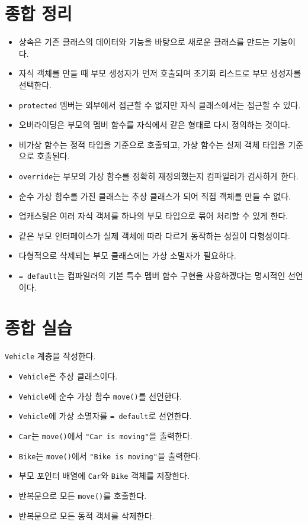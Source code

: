 \documentclass[11pt,a4paper]{article}
\begin{document}
\section{종합 정리}
\begin{importantbox}
\begin{itemize}[leftmargin=1.5em]
    \item 상속은 기존 클래스의 데이터와 기능을 바탕으로 새로운 클래스를 만드는 기능이다.
    \item 자식 객체를 만들 때 부모 생성자가 먼저 호출되며 초기화 리스트로 부모 생성자를 선택한다.
    \item \texttt{protected} 멤버는 외부에서 접근할 수 없지만 자식 클래스에서는 접근할 수 있다.
    \item 오버라이딩은 부모의 멤버 함수를 자식에서 같은 형태로 다시 정의하는 것이다.
    \item 비가상 함수는 정적 타입을 기준으로 호출되고, 가상 함수는 실제 객체 타입을 기준으로 호출된다.
    \item \texttt{override}는 부모의 가상 함수를 정확히 재정의했는지 컴파일러가 검사하게 한다.
    \item 순수 가상 함수를 가진 클래스는 추상 클래스가 되어 직접 객체를 만들 수 없다.
    \item 업캐스팅은 여러 자식 객체를 하나의 부모 타입으로 묶어 처리할 수 있게 한다.
    \item 같은 부모 인터페이스가 실제 객체에 따라 다르게 동작하는 성질이 다형성이다.
    \item 다형적으로 삭제되는 부모 클래스에는 가상 소멸자가 필요하다.
    \item \texttt{= default}는 컴파일러의 기본 특수 멤버 함수 구현을 사용하겠다는 명시적인 선언이다.
\end{itemize}
\end{importantbox}

\section{종합 실습}
\begin{practicebox}
\texttt{Vehicle} 계층을 작성한다.
\begin{itemize}[leftmargin=1.5em]
    \item \texttt{Vehicle}은 추상 클래스이다.
    \item \texttt{Vehicle}에 순수 가상 함수 \texttt{move()}를 선언한다.
    \item \texttt{Vehicle}에 가상 소멸자를 \texttt{= default}로 선언한다.
    \item \texttt{Car}는 \texttt{move()}에서 \texttt{"Car is moving"}을 출력한다.
    \item \texttt{Bike}는 \texttt{move()}에서 \texttt{"Bike is moving"}을 출력한다.
    \item 부모 포인터 배열에 \texttt{Car}와 \texttt{Bike} 객체를 저장한다.
    \item 반복문으로 모든 \texttt{move()}를 호출한다.
    \item 반복문으로 모든 동적 객체를 삭제한다.
\end{itemize}
\end{practicebox}
\end{document}
